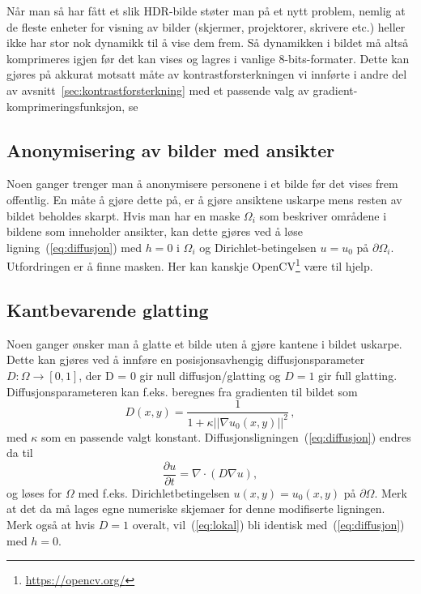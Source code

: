 \documentclass[11pt,a4paper]{article}
\begin{document}
Når man så har fått et slik HDR-bilde støter man på et nytt problem,
nemlig at de fleste enheter for visning av bilder (skjermer,
projektorer, skrivere etc.) heller ikke har stor nok dynamikk til å
vise dem frem. Så dynamikken i bildet må altså komprimeres igjen før
det kan vises og lagres i vanlige 8-bits-formater. Dette kan gjøres på
akkurat motsatt måte av kontrastforsterkningen vi innførte i andre del
av avsnitt~\ref{sec:kontrastforsterkning} med et passende valg av
gradient-komprimeringsfunksjon, se~\cite{Fattal:02}

\subsection{Anonymisering av bilder med ansikter}

Noen ganger trenger man å anonymisere personene i et bilde før det
vises frem offentlig. En måte å gjøre dette på, er å gjøre ansiktene
uskarpe mens resten av bildet beholdes skarpt. Hvis man har en maske
$\Omega_i$ som beskriver områdene i bildene som inneholder ansikter,
kan dette gjøres ved å løse ligning~(\ref{eq:diffusjon}) med $h=0$ i
$\Omega_i$ og Dirichlet-betingelsen $u = u_0$ på $\partial\Omega_i$.
Utfordringen er å finne masken. Her kan kanskje
OpenCV\footnote{\url{https://opencv.org/}} være til hjelp.

\subsection{Kantbevarende glatting}
\label{sec:utvidelse_end}

Noen ganger ønsker man å glatte et bilde uten å gjøre kantene i bildet
uskarpe. Dette kan gjøres ved å innføre en posisjonsavhengig
diffusjonsparameter $D : \Omega \to [0, 1]$, der D = 0 gir null
diffusjon/glatting og $D = 1$ gir full glatting. Diffusjonsparameteren
kan f.eks. beregnes fra gradienten til bildet som
\begin{equation}
  D(x, y) = \frac{1}{1 + \kappa ||\nabla u_0(x, y)||^2}\,,
\end{equation}
med $\kappa$ som en passende valgt konstant.
Diffusjonsligningen~(\ref{eq:diffusjon}) endres da til
\begin{equation}
  \label{eq:lokal}
  \frac{\partial u}{\partial t} = \nabla\cdot(D\nabla u),
\end{equation}
og løses for $\Omega$ med f.eks. Dirichletbetingelsen
$u(x, y) = u_0(x, y)$ på $\partial\Omega$. Merk at det da må lages
egne numeriske skjemaer for denne modifiserte ligningen. Merk også at
hvis $D=1$ overalt, vil~(\ref{eq:lokal}) bli identisk
med~(\ref{eq:diffusjon}) med $h=0$.
\end{document}
